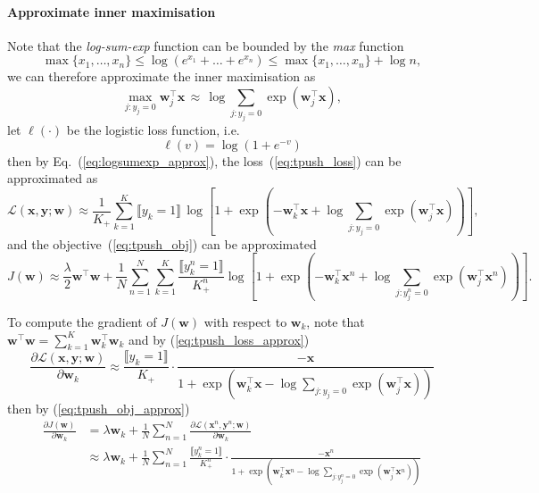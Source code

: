 \documentclass[9pt]{extarticle}
\newcommand{\llb}{\llbracket}
\newcommand{\rrb}{\rrbracket}
\newcommand{\x}{\mathbf{x}}
\newcommand{\y}{\mathbf{y}}
\newcommand{\1}{\mathbf{1}}
\newcommand{\w}{\mathbf{w}}
\newcommand{\LCal}{\mathcal{L}}
\newcommand{\ie}{i.e.\ }
\begin{document}
\paragraph{Approximate inner maximisation}
Note that the \emph{log-sum-exp} function can be bounded by the \emph{max} function~\cite[p. 72]{boyd2004convex}
$$
\max\{x_1, \dots, x_n\} \le \log(e^{x_1} + \dots + e^{x_n}) \le \max\{x_1, \dots, x_n\} + \log n,
$$
we can therefore approximate the inner maximisation as
\begin{equation}
\label{eq:logsumexp_approx}
\max_{j:y_j=0} \w_j^\top \x \, \approx \, \log \sum_{j:y_j=0} \exp(\w_j^\top \x),
\end{equation}
%
let $\ell(\cdot)$ be the logistic loss function, \ie 
$$
\ell(v) = \log(1 + e^{-v})
$$
then by Eq.~(\ref{eq:logsumexp_approx}), the loss~(\ref{eq:tpush_loss}) can be approximated as
\begin{equation}
\label{eq:tpush_loss_approx}
\LCal(\x, \y; \w) \approx \frac{1}{K_+} \sum_{k=1}^K {\llb y_k = 1 \rrb} \,
                          \log \left[ 1 + \exp \left( -\w_k^\top \x + \log \sum_{j:y_j=0} \exp(\w_j^\top \x) \right) \right],
\end{equation}
and the objective~(\ref{eq:tpush_obj}) can be approximated 
\begin{equation}
\label{eq:tpush_obj_approx}
J(\w) \approx \frac{\lambda}{2} \w^\top \w + \frac{1}{N} \sum_{n=1}^N \sum_{k=1}^K \frac{\llb y_k^n = 1 \rrb}{K_+^n} 
              \log \left[ 1 + \exp \left( -\w_k^\top \x^n + \log \sum_{j:y_j^n=0} \exp(\w_j^\top \x^n) \right) \right].
\end{equation}

To compute the gradient of $J(\w)$ with respect to $\w_k$, note that $\w^\top \w = \sum_{k=1}^K \w_k^\top \w_k$ and by (\ref{eq:tpush_loss_approx})
$$
\frac{\partial \LCal(\x, \y; \w)} {\partial \w_k} 
\approx \frac{\llb y_k = 1 \rrb} {K_+} \cdot
        \frac{-\x} {1 + \exp \left( \w_k^\top \x - \log \sum_{j:y_j=0} \exp(\w_j^\top \x) \right)}
$$
then by (\ref{eq:tpush_obj_approx})
\begin{align*}
\frac{\partial J(\w)} {\partial \w_k} 
&= \lambda \w_k + \frac{1}{N} \sum_{n=1}^N \frac{\partial \LCal(\x^n, \y^n; \w)} {\partial \w_k} \\
&\approx \lambda \w_k + \frac{1}{N} \sum_{n=1}^N 
         \frac{\llb y_k^n = 1 \rrb} {K_+^n} \cdot
         \frac{-\x^n} {1 + \exp \left( \w_k^\top \x^n - \log \sum_{j:y_j^n=0} \exp(\w_j^\top \x^n) \right)}
\end{align*}
\end{document}
